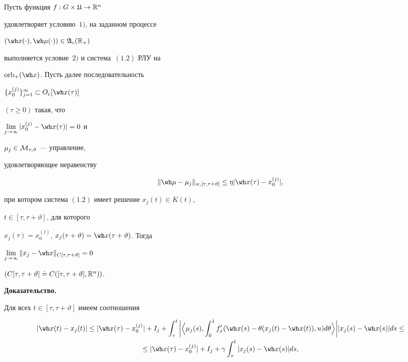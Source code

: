\begin{lems}


Пусть функция $f:G\times\frak U\to\Bbb R^n$


удовлетворяет условию~$1)$, на заданном процессе


$(\wh x(\cdot),\wh\mu(\cdot))\in\frak A_c(\bR_+)$


выполняется условие~$2)$ и система~$(1.2)$ РЛУ на


$\orb_+(\wh x)$. Пусть далее последовательность


$\{x_0^{(j)}\}_{j=1}^\infty\subset O_\varepsilon[\wh x(\tau)]$


$(\tau\ge0)$ такая, что


$\lim\limits_{j\to\infty }|x_0^{(j)}-\wh x(\tau)|=0$ и


$\mu_{j}\in\cal M_{\tau,\vartheta}$ --- управление,


удовлетворяющее неравенству


\begin{equation}


\|\wh\mu-\mu_j\|_{w,[\tau,\tau+\vartheta]}\le\eta


|\wh x(\tau)-x_0^{(j)}|,


\end{equation}


при котором система $(1.2)$ имеет решение $x_j(t)\in K(t)$,


$t\in[\tau,\tau+\vartheta]$, для которого


$x_j(\tau)=x_0^{(j)}$, $x_j(\tau+\vartheta)=\wh


x(\tau+\vartheta)$. Тогда


$\lim\limits_{j\to\infty}\|x_j-\wh x\|_{C[\tau,\tau+\vartheta]}=0$


$(C[\tau,\tau+\vartheta]\doteq C([\tau,\tau+\vartheta],\Bbb R^n))$.


\end{lems}





{\bf Доказательство.}


Для всех $t\in[\tau,\tau+\vartheta]$ имеем соотношения


\begin{gather*}


|\wh x(t)-x_j(t)|\le|\wh x(\tau)-x_0^{(j)}|+I_j+


\int_\tau^t\bigg|\Big\langle \mu_j(s),\int_0^1


f'_x(\wh x(s)-\theta(x_j(t)-\wh x(t)),u)d\theta\Big\rangle\bigg|


|x_j(s)-\wh x(s)|ds\le \\ \le


|\wh x(\tau)-x_0^{(j)}|+I_j+\gamma\int_\tau^t|x_j(s)-\wh x(s)|ds,


\end{gather*}



